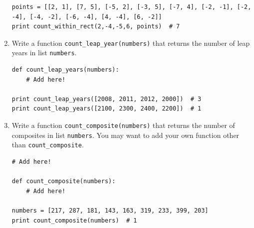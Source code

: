\documentclass[../main.tex]{subfiles}
\begin{document}
\begin{enumerate}
\begin{verbatim}
points = [[2, 1], [7, 5], [-5, 2], [-3, 5], [-7, 4], [-2, -1], [-2, -4], [-4, -2], [-6, -4], [4, -4], [6, -2]]
print count_within_rect(2,-4,-5,6, points)  # 7
\end{verbatim}

\item Write a function \texttt{count\_leap\_year(numbers)} that returns the number of leap years in list \texttt{numbers}.
\begin{verbatim}
def count_leap_years(numbers):
	# Add here!
	
print count_leap_years([2008, 2011, 2012, 2000])  # 3
print count_leap_years([2100, 2300, 2400, 2200])  # 1
\end{verbatim}

\item Write a function \texttt{count\_composite(numbers)} that returns the number of composites in list \texttt{numbers}.
You may want to add your own function other than \texttt{count\_composite}.
\begin{verbatim}
# Add here!

def count_composite(numbers):
	# Add here!
	
numbers = [217, 287, 181, 143, 163, 319, 233, 399, 203]
print count_composite(numbers)  # 1
\end{verbatim}
\end{enumerate}
\end{document}
